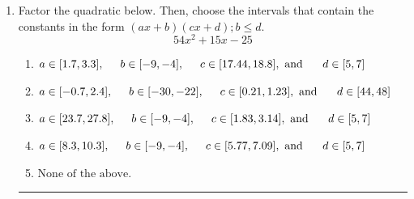 \documentclass[14pt]{extbook}
\newcommand{\litem}[1]{\item#1\hspace*{-1cm}\rule{\textwidth}{0.4pt}}
\begin{document}
\begin{enumerate}
{\begin{enumerate}[label=\Alph*.]
\end{enumerate} }
\litem{
Factor the quadratic below. Then, choose the intervals that contain the constants in the form $(ax+b)(cx+d); b \leq d.$\[ 54x^{2} +15 x -25 \]\begin{enumerate}[label=\Alph*.]
\item \( a \in [1.7, 3.3], \hspace*{5mm} b \in [-9, -4], \hspace*{5mm} c \in [17.44, 18.8], \text{ and } \hspace*{5mm} d \in [5, 7] \)
\item \( a \in [-0.7, 2.4], \hspace*{5mm} b \in [-30, -22], \hspace*{5mm} c \in [0.21, 1.23], \text{ and } \hspace*{5mm} d \in [44, 48] \)
\item \( a \in [23.7, 27.8], \hspace*{5mm} b \in [-9, -4], \hspace*{5mm} c \in [1.83, 3.14], \text{ and } \hspace*{5mm} d \in [5, 7] \)
\item \( a \in [8.3, 10.3], \hspace*{5mm} b \in [-9, -4], \hspace*{5mm} c \in [5.77, 7.09], \text{ and } \hspace*{5mm} d \in [5, 7] \)
\item \( \text{None of the above.} \)


\end{enumerate}}
\end{enumerate}
\end{document}
